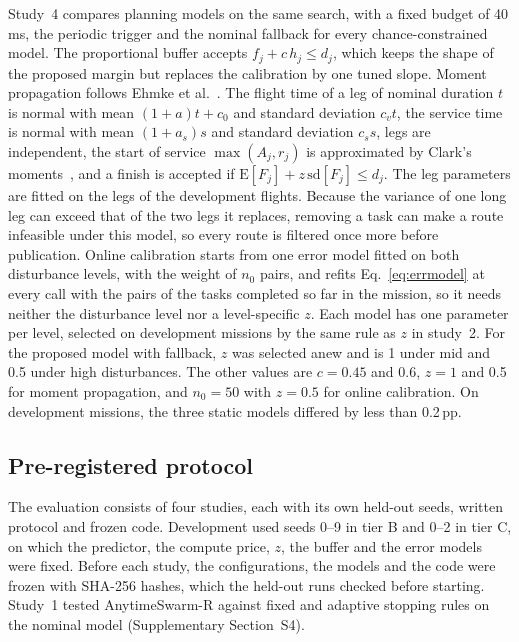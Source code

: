 Study~4 compares planning models on the same search, with a fixed budget of 40\,ms, the periodic trigger and the
nominal fallback for every chance-constrained model. The proportional buffer accepts $f_j+c\,h_j\le d_j$, which keeps
the shape of the proposed margin but replaces the calibration by one tuned slope. Moment propagation follows Ehmke et
al.~\cite{ehmke2015ensuring}. The flight time of a leg of nominal duration $t$ is normal with mean $(1+a)t+c_0$ and
standard deviation $c_v t$, the service time is normal with mean $(1+a_s)s$ and standard deviation $c_s s$, legs are
independent, the start of service $\max(A_j,r_j)$ is approximated by Clark's moments~\cite{clark1961greatest}, and a
finish is accepted if $\mathrm{E}[F_j]+z\,\mathrm{sd}[F_j]\le d_j$. The leg parameters are fitted on the legs of the
development flights. Because the variance of one long leg can exceed that of the two legs it replaces, removing a task
can make a route infeasible under this model, so every route is filtered once more before publication. Online
calibration starts from one error model fitted on both disturbance levels, with the weight of $n_0$ pairs, and refits
Eq.~\eqref{eq:errmodel} at every call with the pairs of the tasks completed so far in the mission, so it needs neither
the disturbance level nor a level-specific $z$. Each model has one parameter per level, selected on development
missions by the same rule as $z$ in study~2. For the proposed model with fallback, $z$ was selected anew and is 1 under
mid and 0.5 under high disturbances. The other values are $c=0.45$ and 0.6, $z=1$ and 0.5 for moment propagation, and
$n_0=50$ with $z=0.5$ for online calibration. On development missions, the three static models differed by less than
0.2\,pp.

\subsection{Pre-registered protocol}\label{sec:protocol}
The evaluation consists of four studies, each with its own held-out seeds, written protocol and frozen code.
Development used seeds 0--9 in tier B and 0--2 in tier C, on which the predictor, the compute price, $z$, the buffer and
the error models were fixed. Before each study, the configurations, the models and the code were frozen with SHA-256
hashes, which the held-out runs checked before starting. Study~1 tested AnytimeSwarm-R against fixed and adaptive
stopping rules on the nominal model (Supplementary Section~S4).

